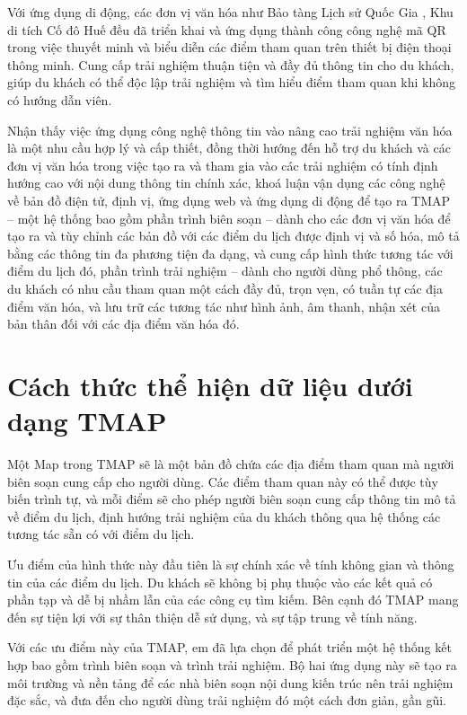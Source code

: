 Với ứng dụng di động, các đơn vị văn hóa như Bảo tàng Lịch sử Quốc Gia
\cite{vtv2022}, Khu di tích Cố đô Huế \cite{hue2022} đều đã triển khai và ứng dụng thành công công nghệ
mã QR trong việc thuyết minh và biểu diễn các điểm tham quan trên thiết bị điện
thoại thông minh. Cung cấp trải nghiệm thuận tiện và đầy đủ thông tin cho du khách,
giúp du khách có thể độc lập trải nghiệm và tìm hiểu điểm tham quan khi không có
hướng dẫn viên.

Nhận thấy việc ứng dụng công nghệ thông tin vào nâng cao trải nghiệm văn
hóa là một nhu cầu hợp lý và cấp thiết, đồng thời hướng đến hỗ trợ du khách và các
đơn vị văn hóa trong việc tạo ra và tham gia vào các trải nghiệm có tính định hướng
cao với nội dung thông tin chính xác, khoá luận vận dụng các công nghệ về bản đồ điện
tử, định vị, ứng dụng web và ứng dụng di động để tạo ra TMAP – một hệ thống bao
gồm phần trình biên soạn – dành cho các đơn vị văn hóa để tạo ra và tùy chỉnh các
bản đồ với các điểm du lịch được định vị và số hóa, mô tả bằng các thông tin đa
phương tiện đa dạng, và cung cấp hình thức tương tác với điểm du lịch đó, phần trình
trải nghiệm – dành cho người dùng phổ thông, các du khách có nhu cầu tham quan
một cách đầy đủ, trọn vẹn, có tuần tự các địa điểm văn hóa, và lưu trữ các tương tác
như hình ảnh, âm thanh, nhận xét của bản thân đối với các địa điểm văn hóa đó.

\section{Cách thức thể hiện dữ liệu dưới dạng TMAP}
Một Map trong TMAP sẽ là một bản đồ chứa các địa điểm tham quan mà
người biên soạn cung cấp cho người dùng. Các điểm tham quan này có thể được tùy
biến trình tự, và mỗi điểm sẽ cho phép người biên soạn cung cấp thông tin mô tả về
điểm du lịch, định hướng trải nghiệm của du khách thông qua hệ thống các tương tác
sẵn có với điểm du lịch.

Ưu điểm của hình thức này đầu tiên là sự chính xác về tính không gian và
thông tin của các điểm du lịch. Du khách sẽ không bị phụ thuộc vào các kết quả có
phần tạp và dễ bị nhầm lẫn của các công cụ tìm kiếm. Bên cạnh đó TMAP mang đến
sự tiện lợi với sự thân thiện dễ sử dụng, và sự tập trung về tính năng.

Với các ưu điểm này của TMAP, em đã lựa chọn để phát triển một hệ thống
kết hợp bao gồm trình biên soạn và trình trải nghiệm. Bộ hai ứng dụng này sẽ tạo ra
môi trường và nền tảng để các nhà biên soạn nội dung kiến trúc nên trải nghiệm đặc
sắc, và đưa đến cho người dùng trải nghiệm đó một cách đơn giản, gần gũi.

